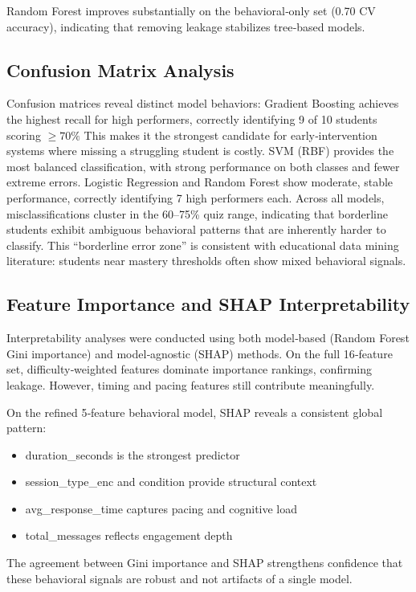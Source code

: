 \documentclass[conference]{IEEEtran}
\begin{document}
Random Forest improves substantially on the behavioral‑only set (0.70 CV accuracy), indicating that removing leakage stabilizes tree‑based models.
\subsection{ Confusion Matrix Analysis}
Confusion matrices reveal distinct model behaviors:
Gradient Boosting achieves the highest recall for high performers, correctly identifying 9 of 10 students scoring $\geq 70\%$
This makes it the strongest candidate for early‑intervention systems where missing a struggling student is costly.
SVM (RBF) provides the most balanced classification, with strong performance on both classes and fewer extreme errors.
Logistic Regression and Random Forest show moderate, stable performance, correctly identifying 7 high performers each.
Across all models, misclassifications cluster in the 60–75\% quiz range, indicating that borderline students exhibit ambiguous behavioral patterns that are inherently harder to classify.
This “borderline error zone” is consistent with educational data mining literature: students near mastery thresholds often show mixed behavioral signals.
\subsection{ Feature Importance and SHAP Interpretability}

Interpretability analyses were conducted using both model‑based (Random Forest Gini importance) and model‑agnostic (SHAP) methods.
On the full 16‑feature set, difficulty‑weighted features dominate importance rankings, confirming leakage. However, timing and pacing features still contribute meaningfully.

On the refined 5‑feature behavioral model, SHAP reveals a consistent global pattern:
\begin{itemize}
    \item duration\_seconds is the strongest predictor
    \item session\_type\_enc and condition provide structural context
    \item avg\_response\_time captures pacing and cognitive load
    \item total\_messages reflects engagement depth
\end{itemize}

The agreement between Gini importance and SHAP strengthens confidence that these behavioral signals are robust and not artifacts of a single model.
\end{document}
